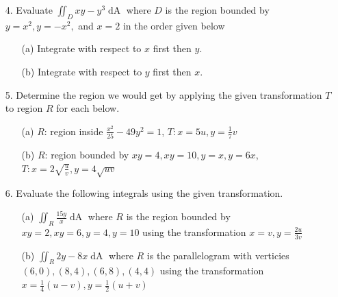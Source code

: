 \documentclass[12pt, amssymb, one column]{article}
\begin{document}
\begin{itemize}
	\item[4.] Evaluate $\iint_D xy-y^3 \mathop{dA}$ where $D$ is the region bounded by $y=x^2, y=-x^2,$ and $x=2$ in the order given below
		\begin{itemize}
			\item[(a)] Integrate with respect to $x$ first then $y$.
			\item[(b)] Integrate with respect to $y$ first then $x$.
		\end{itemize}
	
	\item[5.] Determine the region we would get by applying the given transformation $T$ to region $R$ for each below.
		\begin{itemize}
			\item[(a)] $R$: region inside $\frac{x^2}{25}-49y^2=1$, $T: x=5u, y=\frac{1}{7}v$
			\item[(b)] $R$: region bounded by $xy=4, xy=10, y=x, y=6x$, $T: x=2\sqrt{\frac{u}{v}}, y=4\sqrt{uv}$
		\end{itemize}
	
	\item[6.] Evaluate the following integrals using the given transformation.
		\begin{itemize}
			\item[(a)] $\iint_R \frac{15y}{x} \mathop{dA}$ where $R$ is the region bounded by $xy=2, xy=6, y=4, y=10$ using the transformation $x=v, y=\frac{2u}{3v}$
			\item[(b)] $\iint_R 2y-8x \mathop{dA}$ where $R$ is the parallelogram with verticies $(6,0), (8,4), (6,8), (4,4)$ using the transformation $x=\frac{1}{4}(u-v), y=\frac{1}{2}(u+v)$
		\end{itemize}
\end{itemize}
\end{document}
